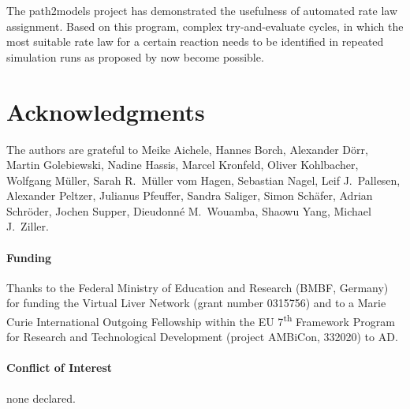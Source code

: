\documentclass{bioinfo}
\begin{document}
The path2models project \citep{Buechel2013} has demonstrated the usefulness of automated rate law assignment.
Based on this program, complex try-and-evaluate cycles, in which the most suitable rate law for a certain reaction needs to be identified in repeated simulation runs as proposed by \citet{Draeger2011} now become possible.

\vspace{-.3cm}
\section*{Acknowledgments}

The authors are grateful to Meike Aichele, Hannes Borch, Alexander D\"orr, Martin Golebiewski, Nadine Hassis, Marcel Kronfeld, Oliver Kohlbacher, Wolfgang M\"uller, Sarah R.~M\"uller vom Hagen, Sebastian Nagel, Leif J.~Pallesen, Alexander Peltzer, Julianus Pfeuffer, Sandra Saliger, Simon Sch\"afer, Adrian Schr\"oder, Jochen Supper, Dieudonn\'e M.~Wouamba, Shaowu Yang, Michael J.~Ziller.
\vspace{-.05cm}
\paragraph{Funding\textcolon}
Thanks to the Federal Ministry of Education and Research (BMBF, Germany) for funding the
Virtual Liver Network (grant number 0315756) and to %
a Marie Curie International Outgoing Fellowship
within the EU 7\textsuperscript{th} Framework Program for Research and Technological Development
(project AMBiCon, 332020) to AD.
\vspace{-.05cm}
\paragraph{Conflict of Interest\textcolon} none declared.
\end{document}
